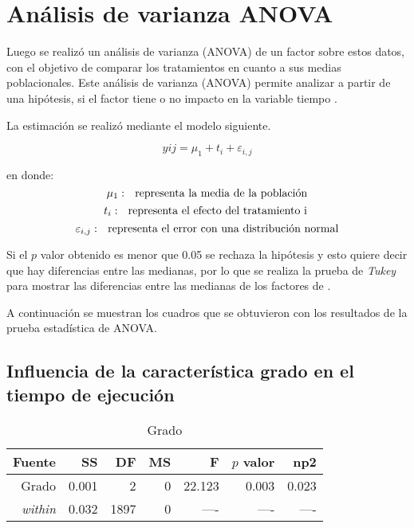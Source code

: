 \documentclass{article}
\begin{document}
\section{Análisis de varianza ANOVA}  
Luego se realizó un análisis de varianza (ANOVA) de un factor sobre estos datos, con el objetivo de comparar los tratamientos en cuanto a sus medias poblacionales. Este análisis de varianza (ANOVA) permite analizar a partir de una hipótesis, si el factor tiene o no impacto en la variable tiempo \cite{fallas}.

La estimación se realizó mediante el modelo siguiente.

\begin{equation}
 y{i}{j} = \mu_{1} + t_{i} + \varepsilon_{i,j}  
\end{equation}

en donde:
\begin{equation}
 \mu_{1}: \ \ \textup{representa la media de la población}
\end{equation}  
\begin{equation}
 t_{i}: \ \ \textup{representa el efecto del tratamiento i }
\end{equation}   
\begin{equation}
 \varepsilon_{i,j}: \ \ \textup{representa el error con una distribución normal}
\end{equation} 

Si el $p$ valor obtenido es menor que 0.05 se rechaza la hipótesis y esto quiere decir que hay diferencias entre las medianas, por lo que se realiza la prueba de \textit{Tukey} para mostrar las diferencias entre las medianas de los factores de \cite{tukey}.  

A continuación se muestran los cuadros que se obtuvieron con los resultados de la prueba estadística de ANOVA. 

\subsection{Influencia de la característica grado en el tiempo de ejecución} 

\begin{table}[H]
\caption{{\small Grado}}
\begin{center}		
	\centering
		\begin{tabular}{rrrrrrr}		
			\hline
			\textbf{Fuente} & \textbf{SS} & \textbf{DF} & \textbf{MS}& \textbf{F}& \textbf{$p$ valor} & \textbf{np2}\\
			
			\hline
			 Grado & 0.001 & 2 &0 & 22.123 & 0.003 & 0.023 \\
			 \textit{within}    & 0.032 & 1897 & 0 & ---- & ---- & ---- \\			 			 
			\hline
		\end{tabular}
		\label{cual}
	\label{tab:una-tablita}
\end{center}	
\end{table}
\end{document}
